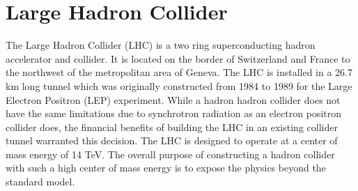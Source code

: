 \chapter{Large Hadron Collider}%
The Large Hadron Collider (LHC) is a two ring superconducting hadron 
accelerator and collider. It is located on the border of Switzerland
and France to the northwest of the metropolitan area of Geneva.
The LHC is installed in a 26.7 km long tunnel which was originally constructed
from 1984 to 1989 for the Large Electron Positron (LEP) experiment. 
While a hadron hadron collider does not have the same limitations
due to synchrotron radiation as an electron positron collider does, %
the financial benefits of building the LHC in an existing collider tunnel 
warranted this decision. 
The LHC is designed to operate at a center of mass energy of 14 TeV.
The overall purpose of constructing a hadron collider with such a high
center of mass energy is to expose the physics beyond the standard model.  

